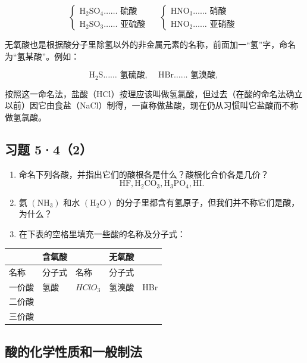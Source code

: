 \[
\left\{ \begin{array}{l} \mathrm{H}_{2} \mathrm{SO}_{4} \dots \dots \text{ 硫酸 } \\ \mathrm{H}_{2} \mathrm{SO}_{3} \dots \dots \text{ 亚硫酸 } \end{array} \right. \quad \left\{ \begin{array}{l} \mathrm{HNO}_{3} \dots \dots \text{ 硝酸 } \\ \mathrm{HNO}_{2} \dots \dots \text{ 亚硝酸 } \end{array} \right.
\]

无氧酸也是根据酸分子里除氢以外的非金属元素的名称，前面加一``氢''字，命名为``氢某酸''。例如：

\[
\mathrm{H}_{2} \mathrm{S} \dots \dots \text{ 氢硫酸, } \quad \mathrm{HBr} \dots \dots \text{ 氢溴酸, }
\]

按照这一命名法，盐酸（HCl）按理应该叫做氢氯酸，但过去（在酸的命名法确立以前）因它由食盐（NaCl）制得，一直称做盐酸，现在仍从习惯叫它盐酸而不称做氢氯酸。

\subsection{习题 5·4（2）}

\begin{enumerate}
\item
  命名下列各酸，并指出它们的酸根各是什么？酸根化合价各是几价？
\[
\mathrm{HF}, \mathrm{H}_{2} \mathrm{CO}_{3}, \mathrm{H}_{3} \mathrm{PO}_{4}, \mathrm{HI}.
\]
\item
  氨 \(\left(\mathrm{NH}_{3}\right)\) 和水
  \(\left(\mathrm{H}_{2}\mathrm{O}\right)\)
  的分子里都含有氢原子，但我们并不称它们是酸，为什么？
\item
  在下表的空格里填充一些酸的名称及分子式：
\end{enumerate}

{\def\LTcaptype{none} %
\begin{longtable}[]{@{}lllll@{}}
\toprule\noalign{}
& 含氧酸 & & 无氧酸 & \\
\midrule\noalign{}
\endhead
\bottomrule\noalign{}
\endlastfoot
名称 & 分子式 & 名称 & 分子式 & \\
一价酸 & 氢酸 & \(HClO_{3}\) & 氢溴酸 & HBr \\
二价酸 & & & & \\
三价酸 & & & & \\
\end{longtable}
}

\subsection{酸的化学性质和一般制法}

